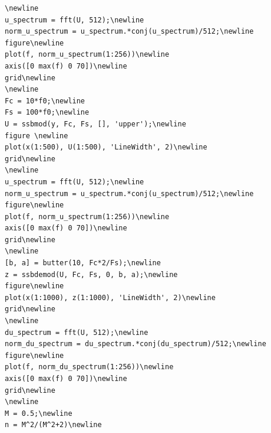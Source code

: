 \documentclass[10pt,a4paper]{report}
\begin{document}
\begin{verbatim}
\newline
u_spectrum = fft(U, 512);\newline
norm_u_spectrum = u_spectrum.*conj(u_spectrum)/512;\newline
figure\newline
plot(f, norm_u_spectrum(1:256))\newline
axis([0 max(f) 0 70])\newline
grid\newline
\newline
Fc = 10*f0;\newline
Fs = 100*f0;\newline
U = ssbmod(y, Fc, Fs, [], 'upper');\newline
figure \newline
plot(x(1:500), U(1:500), 'LineWidth', 2)\newline
grid\newline
\newline
u_spectrum = fft(U, 512);\newline
norm_u_spectrum = u_spectrum.*conj(u_spectrum)/512;\newline
figure\newline
plot(f, norm_u_spectrum(1:256))\newline
axis([0 max(f) 0 70])\newline
grid\newline
\newline
[b, a] = butter(10, Fc*2/Fs);\newline
z = ssbdemod(U, Fc, Fs, 0, b, a);\newline
figure\newline
plot(x(1:1000), z(1:1000), 'LineWidth', 2)\newline
grid\newline
\newline
du_spectrum = fft(U, 512);\newline
norm_du_spectrum = du_spectrum.*conj(du_spectrum)/512;\newline
figure\newline
plot(f, norm_du_spectrum(1:256))\newline
axis([0 max(f) 0 70])\newline
grid\newline
\newline 
M = 0.5;\newline
n = M^2/(M^2+2)\newline
\end{verbatim} 
\end{document}
